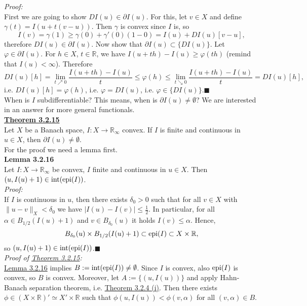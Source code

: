 \textit{Proof:}\\
First we are going to show $DI(u)\in\partial I(u)$. For this, let $v\in X$ and define $\gamma(t)=I(u+t(v-u))$. Then $\gamma$ is convex since $I$ is, so
\[I(v)=\gamma(1)\geq\gamma(0)+\gamma'(0)(1-0)=I(u)+DI(u)[v-u],\]
therefore $DI(u)\in\partial I(u)$. Now show that $\partial I(u)\subset\{DI(u)\}$. Let $\varphi\in\partial I(u)$. For $h\in X$, $t\in\mathbb{R}$, we have $I(u+th)-I(u)\geq\varphi(th)$ (remind that $I(u)<\infty$). Therefore
\[DI(u)[h]=\lim_{t\nearrow0}{\frac{I(u+th)-I(u)}{t}}\leq\varphi(h)\leq\lim_{t\searrow0}{\frac{I(u+th)-I(u)}{t}}=DI(u)[h],\]
i.e. $DI(u)[h]=\varphi(h)$, i.e. $\varphi=DI(u)$, i.e. $\varphi\in\{DI(u)\}$.\hfill$\blacksquare$\\[11pt]

When is $I$ subdifferentiable? This means, when is $\partial I(u)\ne\emptyset$? We are interested in an answer for more general functionals.\\[11pt]

\hypertarget{theorem_3_2_15}{\textbf{\underline{Theorem 3.2.15}}}\\
Let $X$ be a Banach space, $I:X\longrightarrow\mathbb{R}_\infty$ convex. If $I$ is finite and continuous in $u\in X$, then $\partial I(u)\ne\emptyset$.\\

For the proof we need a lemma first.\\

\hypertarget{lemma_3_2_16}{\textbf{Lemma 3.2.16}}\\
Let $I:X\longrightarrow\mathbb{R}_\infty$ be convex, $I$ finite and continuous in $u\in X$. Then $(u,I(u)+1)\in\operatorname{int}\mathopen{}\left(\operatorname{epi}\mathopen{}\left(I\right)\mathclose{}\right)\mathclose{}$.\\

\textit{Proof:}\\
If $I$ is continuous in $u$, then there exists $\delta_0>0$ such that for all $v\in X$ with $\lVert u-v\rVert_X<\delta_0$ we have $\lvert I(u)-I(v)\rvert\leq\frac{1}{2}$. In particular, for all $\alpha\in B_{1/2}(I(u)+1)$ and $v\in B_{\delta_0}(u)$ it holds $I(v)\leq\alpha$. Hence,
\[B_{\delta_0}(u)\times B_{1/2}(I(u)+1)\subset\operatorname{epi}\mathopen{}\left(I\right)\mathclose{}\subset X\times\mathbb{R},\]
so $(u,I(u)+1)\in\operatorname{int}\mathopen{}\left(\operatorname{epi}\mathopen{}\left(I\right)\mathclose{}\right)\mathclose{}$.\hfill$\blacksquare$\\[11pt]

\textit{Proof of \hyperlink{theorem_3_2_15}{Theorem 3.2.15}:}\\
\hyperlink{lemma_3_2_16}{Lemma 3.2.16} implies $B:=\operatorname{int}\mathopen{}\left(\operatorname{epi}\mathopen{}\left(I\right)\mathclose{}\right)\mathclose{}\ne\emptyset$. Since $I$ is convex, also $\operatorname{epi}\mathopen{}\left(I\right)\mathclose{}$ is convex, so $B$ is convex. Moreover, let $A:=\{(u,I(u))\}$ and apply Hahn-Banach separation theorem, i.e. \hyperlink{theorem_3_2_4}{Theorem 3.2.4 (i)}. Then there exists $\phi\in(X\times\mathbb{R})'\simeq X'\times\mathbb{R}$ such that $\phi(u,I(u))<\phi(v,\alpha)$ for all $(v,\alpha)\in B$.\\

